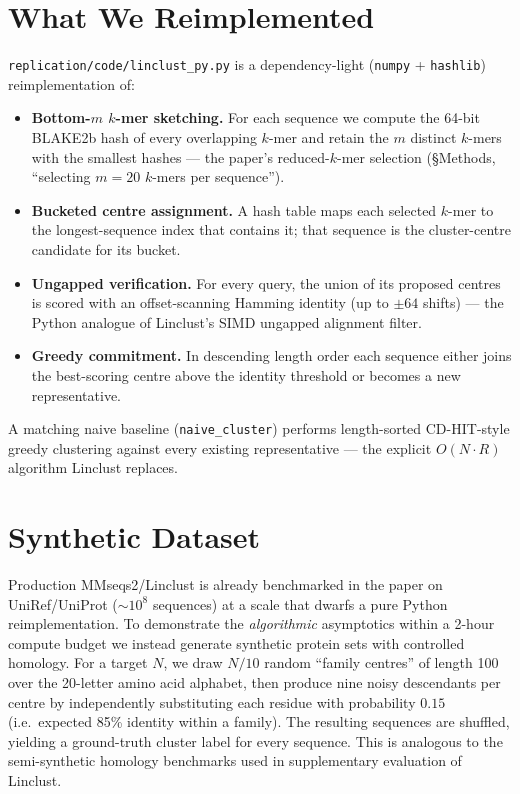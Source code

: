 \documentclass[11pt,a4paper]{article}
\begin{document}
\section{What We Reimplemented}
\texttt{replication/code/linclust\_py.py} is a dependency-light
(\texttt{numpy} + \texttt{hashlib}) reimplementation of:
\begin{itemize}
    \item \textbf{Bottom-$m$ $k$-mer sketching.} For each sequence we
      compute the 64-bit BLAKE2b hash of every overlapping $k$-mer and
      retain the $m$ distinct $k$-mers with the smallest hashes --- the
      paper's reduced-$k$-mer selection (\S Methods, ``selecting
      $m=20$ $k$-mers per sequence'').
    \item \textbf{Bucketed centre assignment.} A hash table maps each
      selected $k$-mer to the longest-sequence index that contains it;
      that sequence is the cluster-centre candidate for its bucket.
    \item \textbf{Ungapped verification.} For every query, the union of
      its proposed centres is scored with an offset-scanning Hamming
      identity (up to $\pm 64$ shifts) --- the Python analogue of
      Linclust's SIMD ungapped alignment filter.
    \item \textbf{Greedy commitment.} In descending length order each
      sequence either joins the best-scoring centre above the identity
      threshold or becomes a new representative.
\end{itemize}
A matching naive baseline (\texttt{naive\_cluster}) performs length-sorted
CD-HIT-style greedy clustering against every existing representative ---
the explicit $O(N \cdot R)$ algorithm Linclust replaces.

\section{Synthetic Dataset}
Production MMseqs2/Linclust is already benchmarked in the paper on
UniRef/UniProt ($\sim$$10^8$ sequences) at a scale that dwarfs a pure
Python reimplementation.  To demonstrate the \emph{algorithmic}
asymptotics within a 2-hour compute budget we instead generate synthetic
protein sets with controlled homology.  For a target $N$, we draw
$N/10$ random ``family centres'' of length 100 over the 20-letter amino
acid alphabet, then produce nine noisy descendants per centre by
independently substituting each residue with probability $0.15$
(i.e.\ expected 85\% identity within a family).  The resulting
sequences are shuffled, yielding a ground-truth cluster label for every
sequence.  This is analogous to the semi-synthetic homology benchmarks
used in supplementary evaluation of Linclust.
\end{document}
